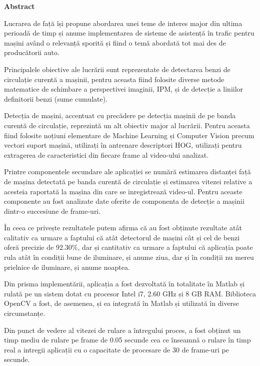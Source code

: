 \thispagestyle{plain}

\begin{center}
	\Large \textbf{Abstract}	
\end{center}

Lucrarea de față își propune abordarea unei teme de interes major din ultima perioadă de timp și anume implementarea de sisteme de asistență în trafic pentru mașini având o relevanță sporită și fiind o temă abordată tot mai des de producătorii auto. 

Principalele obiective ale lucrării sunt reprezentate de detectarea benzi de circulație curentă a mașinii, pentru aceasta fiind folosite diverse metode matematice de schimbare a perspectivei imaginii, IPM, și de detecție a liniilor definitorii benzi (sume cumulate).

Detecția de mașini, accentuat cu precădere pe detecția mașinii de pe banda curentă de circulație, reprezintă un alt obiectiv major al lucrării. Pentru aceasta fiind folosite noțiuni elementare de Machine Learning și Computer Vision precum vectori suport mașină, utilizați în antrenare descriptori HOG, utilizați pentru extragerea de caracteristici din fiecare frame al video-ului analizat.

Printre componentele secundare ale aplicației se numără estimarea distanței față de mașina detectată pe banda curentă de circulație și estimarea vitezei relative a acesteia raportată la mașina din care se inregistrează video-ul. Pentru aceaste componente au fost analizate date oferite de componenta de detecție a mașinii dintr-o succesiune de frame-uri.

În ceea ce privește rezultatele putem afirma că au fost obținute rezultate atât calitativ ca urmare a faptului că atât detectorul de mașini cât și cel de benzi oferă precizie de $92.30\%$, dar și cantitativ ca urmare a faptului că aplicația poate rula atât în condiții bune de iluminare, și anume ziua, dar și în condiții nu mereu prielnice de iluminare, și anume noaptea.

Din prisma implementării, aplicația a fost dezvoltată în totalitate în Matlab și rulată pe un sistem dotat cu procesor Intel i7, 2.60 GHz și 8 GB RAM. Biblioteca OpenCV a fost, de asemenea, și ea integrată în Matlab și utilizată în diverse circumstanțe.

Din punct de vedere al vitezei de rulare a întregului proces, a fost obținut un timp mediu de rulare pe frame de 0.05 secunde cea ce înseamnă o rulare în timp real a intregii aplicații cu o capacitate de procesare de 30 de frame-uri pe secunde.  
\vspace*{\fill}
